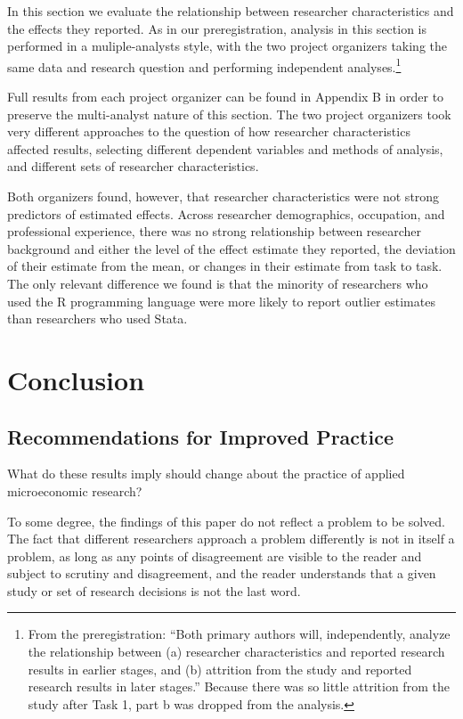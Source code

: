 \documentclass[
  letterpaper,
  DIV=11,
  numbers=noendperiod]{scrartcl}
\begin{document}
In this section we evaluate the relationship between researcher
characteristics and the effects they reported. As in our
preregistration, analysis in this section is performed in a
muliple-analysts style, with the two project organizers taking the same
data and research question and performing independent
analyses.\footnote{From the preregistration: ``Both primary authors
  will, independently, analyze the relationship between (a) researcher
  characteristics and reported research results in earlier stages, and
  (b) attrition from the study and reported research results in later
  stages.'' Because there was so little attrition from the study after
  Task 1, part b was dropped from the analysis.}

Full results from each project organizer can be found in Appendix B in
order to preserve the multi-analyst nature of this section. The two
project organizers took very different approaches to the question of how
researcher characteristics affected results, selecting different
dependent variables and methods of analysis, and different sets of
researcher characteristics.

Both organizers found, however, that researcher characteristics were not
strong predictors of estimated effects. Across researcher demographics,
occupation, and professional experience, there was no strong
relationship between researcher background and either the level of the
effect estimate they reported, the deviation of their estimate from the
mean, or changes in their estimate from task to task. The only relevant
difference we found is that the minority of researchers who used the R
programming language were more likely to report outlier estimates than
researchers who used Stata.

\section{Conclusion}\label{conclusion}

\subsection{Recommendations for Improved
Practice}\label{recommendations-for-improved-practice}

What do these results imply should change about the practice of applied
microeconomic research?

To some degree, the findings of this paper do not reflect a problem to
be solved. The fact that different researchers approach a problem
differently is not in itself a problem, as long as any points of
disagreement are visible to the reader and subject to scrutiny and
disagreement, and the reader understands that a given study or set of
research decisions is not the last word.
\end{document}
